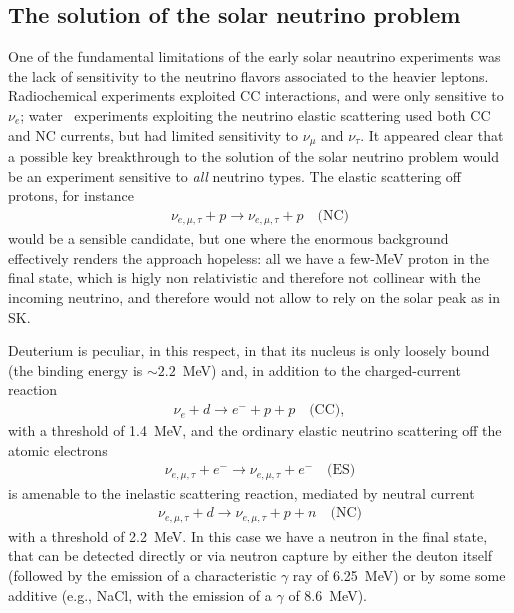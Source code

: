 \subsection{The solution of the solar neutrino problem}

One of the fundamental limitations of the early solar neautrino experiments was the
lack of sensitivity to the neutrino flavors associated to the heavier leptons. Radiochemical
experiments exploited CC interactions, and were only sensitive to $\nu_e$; water
\cherenkov\ experiments exploiting the neutrino elastic scattering used both
CC and NC currents, but had limited sensitivity to $\nu_\mu$ and $\nu_\tau$.
It appeared clear that a possible key breakthrough to the solution of the solar
neutrino problem would be an experiment sensitive to \emph{all} neutrino types. The
elastic scattering off protons, for instance
\begin{align*}
  \nu_{e, \mu, \tau} + p \rightarrow  \nu_{e, \mu, \tau} + p
  \quad\text{(NC)}
\end{align*}
would be a sensible candidate, but one where the enormous background effectively
renders the approach hopeless: all we have a few-MeV proton in the final state,
which is higly non relativistic and therefore not collinear with the incoming neutrino,
and therefore would not allow to rely on the solar peak as in SK.

Deuterium is peculiar, in this respect, in that its nucleus is only loosely bound
(the binding energy is $\sim 2.2$~MeV) and, in addition to the charged-current reaction
\begin{align*}
  \nu_e + d \rightarrow e^- + p + p \quad\text{(CC)},
\end{align*}
with a threshold of 1.4~MeV, and the ordinary elastic neutrino scattering off the
atomic electrons
\begin{align*}
  \nu_{e, \mu, \tau} + e^- \rightarrow  \nu_{e, \mu, \tau} + e^-
  \quad\text{(ES)}
\end{align*}
is amenable to the inelastic scattering reaction, mediated by neutral current
\begin{align*}
  \nu_{e, \mu, \tau} + d \rightarrow  \nu_{e, \mu, \tau} + p + n
  \quad\text{(NC)}
\end{align*}
with a threshold of 2.2~MeV. In this case we have a neutron in the final state, that
can be detected directly or via neutron capture by either the deuton itself (followed
by the emission of a characteristic $\gamma$ ray of 6.25~MeV) or by some some additive
(e.g., NaCl, with the emission of a $\gamma$ of 8.6~MeV).

